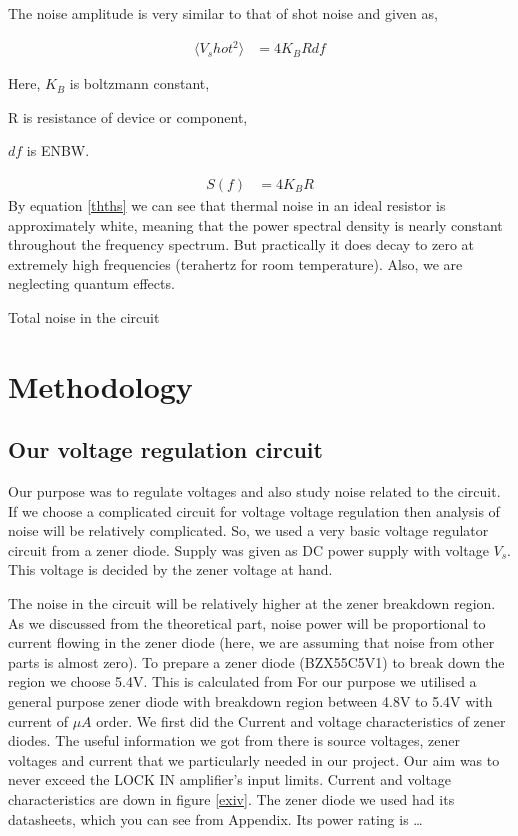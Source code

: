 \documentclass[final,5p,12pt,twocolumn]{elsaarticle}
\begin{document}
The noise amplitude is very similar to that of shot noise and given as,

\begin{align}\label{ththvo}
\langle V_shot^2\rangle & = 4 K_B R df
\end{align}

Here, $K_B$ is boltzmann constant,

R is resistance of device or component,

$df$ is ENBW.

\begin{align}\label{thths}
S(f) & = 4 K_B R
\end{align}
By equation \ref{thths} we can see that thermal noise in an ideal resistor is approximately white, meaning that the power spectral density is nearly constant throughout the frequency spectrum. But practically it does decay to zero at extremely high frequencies (terahertz for room temperature). Also, we are neglecting quantum effects. 


Total noise in the circuit




\section{Methodology}\label{methodology}


\subsection{Our voltage regulation circuit}

Our purpose was to regulate voltages and also study noise related to the circuit. If we choose a complicated circuit for voltage voltage regulation then analysis of noise will be relatively complicated. So, we used a very basic voltage regulator circuit from a zener diode. Supply was given as DC power supply with voltage $V_{s}$. This voltage is decided by the zener voltage at hand.

The noise in the circuit will be relatively higher at the zener breakdown region. As we discussed from the theoretical part, noise power will be proportional to current flowing in the zener diode (here, we are assuming that noise from other parts is almost zero). To prepare a zener diode (BZX55C5V1) to break down the region we choose 5.4V. This is calculated from 
For our purpose we utilised a general purpose zener diode with breakdown region between 4.8V to 5.4V with current of $\mu A$ order. We first did the Current and voltage characteristics of zener diodes. The useful information we got from there is source voltages, zener voltages and current that we particularly needed in our project. Our aim was to never exceed the LOCK IN amplifier’s input limits. Current and voltage characteristics are down in figure \ref{exiv}. The zener diode we used had its datasheets, which you can see from Appendix. Its power rating is … 
\end{document}
